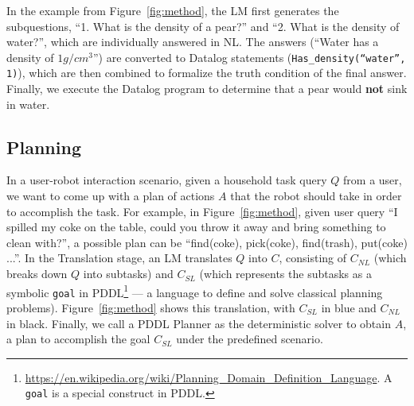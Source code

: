 \documentclass[11pt]{article}
\begin{document}
In the example from Figure~\ref{fig:method}, the LM first generates the subquestions, ``1. What is the density of a pear?'' and ``2. What is the density of water?'', which are individually answered in NL. The answers (``Water has a density of $1 g/cm^3$'') are converted to Datalog statements (\texttt{Has\_density(``water'', 1)}), which are then combined to formalize the truth condition of the final answer. Finally, we execute the Datalog program to determine that a pear would \textbf{not} sink in water.


\subsection{Planning} 

In a user-robot interaction scenario, given a household task query $Q$ from a user, we want to come up with a plan of actions $A$ that the robot should take in order to accomplish the task. For example, in Figure~\ref{fig:method}, given user query ``I spilled my coke on the table, could you throw it away and bring something to clean with?'', a possible plan can be ``find(coke), pick(coke), find(trash), put(coke) ...''. In the Translation stage, an LM translates $Q$ into $C$, consisting of $C_{NL}$ (which breaks down $Q$ into subtasks) and $C_{SL}$ (which represents the subtasks as a symbolic \texttt{goal} in PDDL\footnote{\url{https://en.wikipedia.org/wiki/Planning_Domain_Definition_Language}. A \texttt{goal} is a special construct in PDDL.} --- a language to define and solve classical planning problems).
Figure~\ref{fig:method} shows this translation, with $C_{SL}$ in blue and $C_{NL}$ in black. Finally, we call a PDDL Planner as the deterministic solver to obtain $A$, a plan to accomplish the goal $C_{SL}$ under the predefined scenario.

\end{document}
